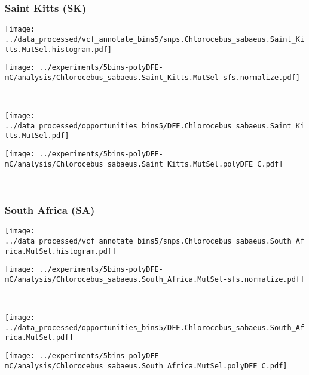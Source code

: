 \subsubsection{Saint Kitts (SK)}

\begin{minipage}{0.49\linewidth}
    \texttt{[image: ../data\_processed/vcf\_annotate\_bins5/snps.Chlorocebus\_sabaeus.Saint\_Kitts.MutSel.histogram.pdf]}
\end{minipage}
\begin{minipage}{0.49\linewidth}
    \texttt{[image: ../experiments/5bins-polyDFE-mC/analysis/Chlorocebus\_sabaeus.Saint\_Kitts.MutSel-sfs.normalize.pdf]}
\end{minipage}
\\
\begin{minipage}{0.49\linewidth}
    \texttt{[image: ../data\_processed/opportunities\_bins5/DFE.Chlorocebus\_sabaeus.Saint\_Kitts.MutSel.pdf]}
\end{minipage}
\begin{minipage}{0.49\linewidth}
    \texttt{[image: ../experiments/5bins-polyDFE-mC/analysis/Chlorocebus\_sabaeus.Saint\_Kitts.MutSel.polyDFE\_C.pdf]}
\end{minipage}
\\

\subsubsection{South Africa (SA)}

\begin{minipage}{0.49\linewidth}
    \texttt{[image: ../data\_processed/vcf\_annotate\_bins5/snps.Chlorocebus\_sabaeus.South\_Africa.MutSel.histogram.pdf]}
\end{minipage}
\begin{minipage}{0.49\linewidth}
    \texttt{[image: ../experiments/5bins-polyDFE-mC/analysis/Chlorocebus\_sabaeus.South\_Africa.MutSel-sfs.normalize.pdf]}
\end{minipage}
\\
\begin{minipage}{0.49\linewidth}
    \texttt{[image: ../data\_processed/opportunities\_bins5/DFE.Chlorocebus\_sabaeus.South\_Africa.MutSel.pdf]}
\end{minipage}
\begin{minipage}{0.49\linewidth}
    \texttt{[image: ../experiments/5bins-polyDFE-mC/analysis/Chlorocebus\_sabaeus.South\_Africa.MutSel.polyDFE\_C.pdf]}
\end{minipage}
\\

